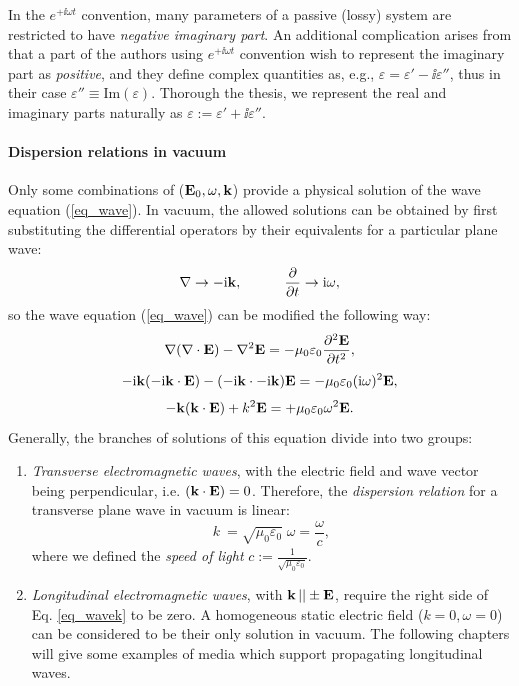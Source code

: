 In the $e^{+\ii\omega t}$ convention, many parameters of a passive (lossy) system are restricted to have \textit{negative imaginary part}.  An additional complication arises from that a part of the authors using $e^{+\ii\omega t}$ convention wish to represent the imaginary part as \textit{positive}, and they define complex quantities as, e.g., $\varepsilon = \varepsilon' - \ii \varepsilon''$, thus in their case $\varepsilon''\equiv \text{Im}(\varepsilon)$. Thorough the thesis, we represent the real and imaginary parts naturally as $\varepsilon := \varepsilon' + \ii \varepsilon'' $.
\paragraph{Dispersion relations in vacuum} %
Only some combinations of ($\mathbf{E}_0, \omega, {\mathbf{k}}$) provide a physical solution of the wave equation (\ref{eq_wave}). In vacuum, the allowed solutions can be obtained by first substituting the differential operators by their equivalents for a particular plane wave: %
\begin{equation} \nabla \rightarrow -{\mathrm i}{\mathbf{k}}, \quad\quad\quad 
\frac{\partial} {\partial t} \rightarrow {\mathrm i}\omega, \label{eq_difftok}\end{equation}
so the wave equation (\ref{eq_wave}) can be modified the following way:
$$					\nabla (\nabla \cdot \mathbf{E}) - \nabla^2 \mathbf{E}				  =	-\mu_0 \varepsilon_0 \frac{\partial^{2} \mathbf{E}}{\partial t^{2}},  $$
$$				 -{\mathrm i}{\mathbf{k}} (-{\mathrm i}{\mathbf{k}} \cdot \mathbf{E})  - (-{\mathrm i}{\mathbf{k}} \cdot -{\mathrm i}{\mathbf{k}}) \mathbf{E} = -\mu_0 \varepsilon_0 ({\mathrm i}\omega)^2 \mathbf{E}, $$
\begin{equation}   - {\mathbf{k}} ({\mathbf{k}} \cdot \mathbf{E})      +          k^2 \mathbf{E}            = +\mu_0 \varepsilon_0 \omega^{2} \mathbf{E}.  \label{eq_wavek}\end{equation}
Generally, the branches  of solutions of this equation divide into two groups: %
\begin{enumerate}
 \item{\textit{Transverse electromagnetic waves}, with the electric field and wave vector being perpendicular, i.e. $({\mathbf{k}} \cdot \mathbf{E}) = 0$. Therefore, the \textit{dispersion relation} for a transverse plane wave in vacuum is linear:
\begin{equation} k~= \sqrt{\mu_0 \varepsilon_0}\; \omega = \frac{\omega}{c}, \label{eq_dispeq_vac}\end{equation}
where we defined the \textit{speed of light} $c := \frac{1}{\sqrt{\mu_0 \varepsilon_0}}$.
} 
 \item{\textit{Longitudinal electromagnetic waves}, with ${\mathbf{k}}\,|| \pm \mathbf{E}$, require the right side of Eq. \ref{eq_wavek} to be zero. A homogeneous static electric field ($k = 0, \omega = 0$) can be considered to be their only solution in vacuum. The following chapters will give some examples of media which support propagating longitudinal waves.} 
 \end{enumerate}


